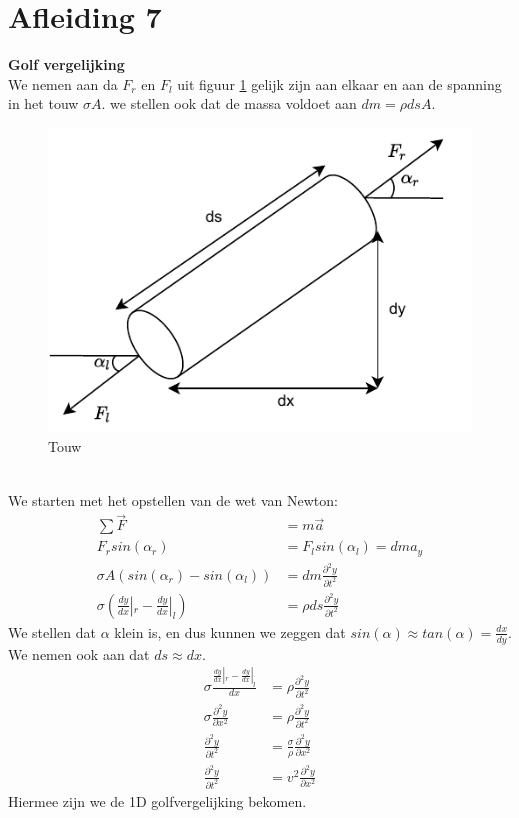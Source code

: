 \documentclass[a4paper,kul]{kulakarticle} %
\begin{document}
\section{Afleiding 7}
\textbf{Golf vergelijking}\\
We nemen aan da $F_r$ en $F_l$ uit figuur \ref{fig:touwgolf} gelijk zijn aan elkaar en aan de spanning in het touw $\sigma A$. we stellen ook dat de massa voldoet aan $dm=\rho dsA$.\\
\begin{figure}[htbp]
	\centering
	\includegraphics[width=0.7\linewidth]{"touw_golf"}
	\caption[Touw]{Touw}
	\label{fig:touwgolf}
\end{figure}\\
We starten met het opstellen van de wet van Newton:
\begin{align*}
	\sum\vec{F}&=m\vec{a}\\
	F_rsin(\alpha_r) & = F_lsin(\alpha_l) = dma_y\\
	\sigma A(sin(\alpha_r)-sin(\alpha_l)) & = dm\frac{\partial^2y}{\partial t^2}\\
	\sigma(\frac{dy}{dx}|_r-\frac{dy}{dx}|_l) & = \rho ds \frac{\partial^2y}{\partial t^2}
\end{align*}
We stellen dat $\alpha$ klein is, en dus kunnen we zeggen dat $sin(\alpha)\approx tan(\alpha) = \frac{dx}{dy}$. We nemen ook aan dat $ds \approx dx$.
\begin{align*}
	\sigma\frac{\frac{dy}{dx}|_r-\frac{dy}{dx}|_l}{dx} & = \rho \frac{\partial^2y}{\partial t^2}\\
	\sigma\frac{\partial^2y}{\partial x^2} & = \rho \frac{\partial^2y}{\partial t^2}\\
	\frac{\partial^2y}{\partial t^2} & = \frac{\sigma}{\rho}\frac{\partial^2y}{\partial x^2}\\
	\frac{\partial^2y}{\partial t^2} & = v^2\frac{\partial^2y}{\partial x^2}
\end{align*}
Hiermee zijn we de 1D golfvergelijking bekomen.
\newpage
\end{document}
